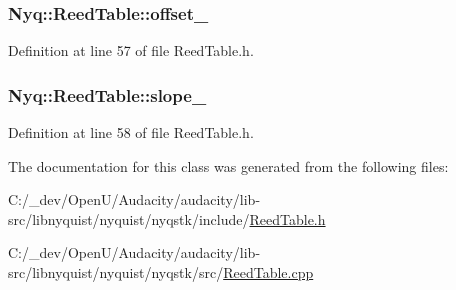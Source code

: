 \subsubsection[{\texorpdfstring{offset\+\_\+}{offset_}}]{ Nyq\+::\+Reed\+Table\+::offset\+\_\+\hspace{0.3cm}{\ttfamily [protected]}}\hypertarget{class_nyq_1_1_reed_table_a98366f744acf9b95cd75c89860809d2e}{}\label{class_nyq_1_1_reed_table_a98366f744acf9b95cd75c89860809d2e}


Definition at line 57 of file Reed\+Table.\+h.

\subsubsection[{\texorpdfstring{slope\+\_\+}{slope_}}]{ Nyq\+::\+Reed\+Table\+::slope\+\_\+\hspace{0.3cm}{\ttfamily [protected]}}\hypertarget{class_nyq_1_1_reed_table_a2fa38621d1836b0cb10c8d275815f125}{}\label{class_nyq_1_1_reed_table_a2fa38621d1836b0cb10c8d275815f125}


Definition at line 58 of file Reed\+Table.\+h.



The documentation for this class was generated from the following files\+:\begin{DoxyCompactItemize}
\item 
C\+:/\+\_\+dev/\+Open\+U/\+Audacity/audacity/lib-\/src/libnyquist/nyquist/nyqstk/include/\hyperlink{_reed_table_8h}{Reed\+Table.\+h}\item 
C\+:/\+\_\+dev/\+Open\+U/\+Audacity/audacity/lib-\/src/libnyquist/nyquist/nyqstk/src/\hyperlink{_reed_table_8cpp}{Reed\+Table.\+cpp}\end{DoxyCompactItemize}
